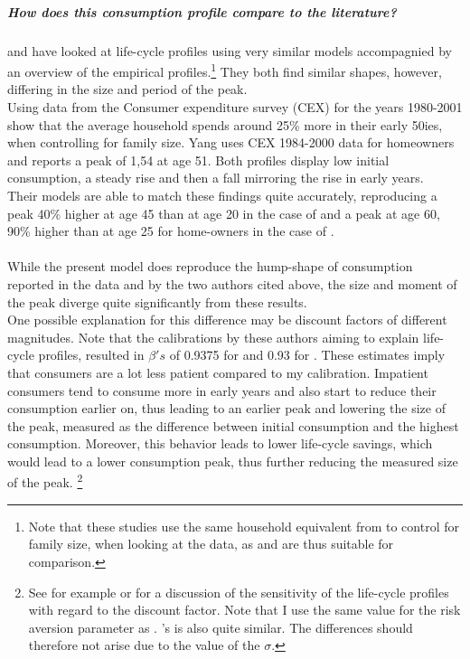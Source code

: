 \documentclass[a4paper,12pt,legno]{article}
\begin{document}
\subparagraph{How does this consumption profile compare to the literature?} \cite{FV&K2011} and \cite{yang2009} have looked at life-cycle profiles using very similar models accompagnied by an overview of the empirical profiles.\footnote{Note that these studies use the same household equivalent from \cite{fernandez2007consumption} to control for family size, when looking at the data, as \cite{hintermaier2011} and are thus suitable for comparison.} They both find similar shapes, however, differing in the size and period of the peak.\\
Using data from the Consumer expenditure survey (CEX) for the years 1980-2001 \cite{FV&K2011} show that the average household spends around 25\% more in their early 50ies, when controlling for family size. Yang uses CEX 1984-2000 data for homeowners and reports a peak of 1,54 at age 51. Both profiles display low initial consumption, a steady rise and then a fall mirroring the rise in early years. \\
Their models are able to match these findings quite accurately, reproducing a peak 40\% higher at age 45 than at age 20 in the case of \citep{FV&K2011} and a peak at age 60, 90\% higher than at age 25 for home-owners in the case of \cite{yang2009}. 
\\ \\
While the present model does reproduce the hump-shape of consumption reported in the data and by the two authors cited above, the size and moment of the peak diverge quite significantly from these results. \\
One possible explanation for this difference may be discount factors of different magnitudes. Note that the calibrations by these authors aiming to explain life-cycle profiles, resulted in $\beta 's$ of 0.9375 for \cite{FV&K2011} and 0.93 for \cite{yang2009}. These estimates imply that consumers are a lot less patient compared to my calibration. Impatient consumers tend to consume more in early years and also start to reduce their consumption earlier on, thus leading to an earlier peak and lowering the size of the peak, measured as the difference between initial consumption and the highest consumption. Moreover, this behavior leads to lower life-cycle savings, which would lead to a lower consumption peak, thus further reducing the measured size of the peak. \footnote{See for example \citep{Gourinchas&Parker2002} or \cite{cagetti2003} for a discussion of the sensitivity of the life-cycle profiles with regard to the discount factor. Note that I use the same value for the risk aversion parameter as \cite{yang2009}. \cite{FV&K2011}'s is also quite similar. The differences should therefore not arise due to the value of the $\sigma$.}
\end{document}
